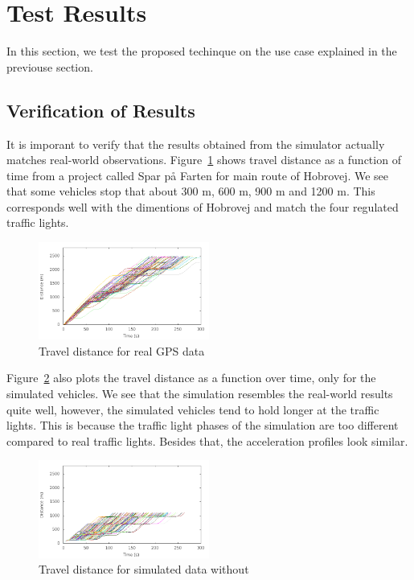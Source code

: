\section{Test Results}\label{sec:Test}
In this section, we test the proposed techinque on the use case explained in the previouse section.

\subsection{Verification of Results}
It is imporant to verify that the results obtained from the simulator actually matches real-world observations.
Figure~\ref{fig:TestResults:realDistance} shows travel distance as a function of time from a project called Spar på Farten\cite{} for main route of Hobrovej.
We see that some vehicles stop that about 300 m, 600 m, 900 m and 1200 m.
This corresponds well with the dimentions of Hobrovej and match the four regulated traffic lights. 

\begin{figure}[htb]
\includegraphics[width=0.5\textwidth]{../images/Real/RealDistance.png}
\caption{Travel distance for real GPS data}
\label{fig:TestResults:realDistance}
\end{figure}

Figure~\ref{fig:TestResults:distance0} also plots the travel distance as a function over time, only for the simulated vehicles.
We see that the simulation resembles the real-world results quite well, however, the simulated vehicles tend to hold longer at the traffic lights. 
This is because the traffic light phases of the simulation are too different compared to real traffic lights. 
Besides that, the acceleration profiles look similar.

\begin{figure}[htb]
\includegraphics[width=0.5\textwidth]{../images/tp0/distanceUncontrolled0.png}
\caption{Travel distance for simulated data without \tech}
\label{fig:TestResults:distance0}
\end{figure}

